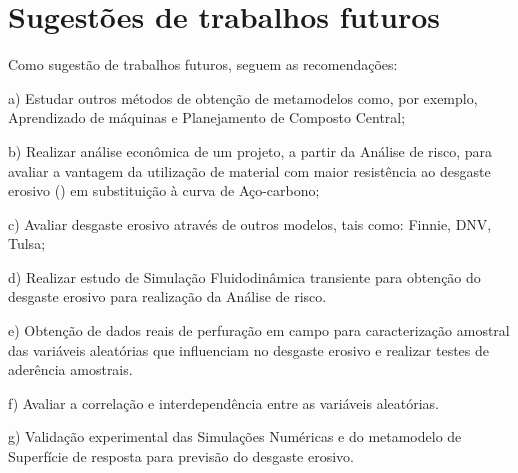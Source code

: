 \section{Sugestões de trabalhos futuros}

Como sugestão de trabalhos futuros, seguem as recomendações:

a) Estudar outros métodos de obtenção de metamodelos como, por exemplo, Aprendizado de máquinas e Planejamento de Composto Central;

b) Realizar análise econômica de um projeto, a partir da Análise de risco, para avaliar a vantagem da utilização de material com maior resistência ao desgaste erosivo () em substituição à curva de Aço-carbono;

c) Avaliar desgaste erosivo através de outros modelos, tais como: Finnie, DNV, Tulsa;

d) Realizar estudo de Simulação Fluidodinâmica transiente para obtenção do desgaste erosivo para realização da Análise de risco.

e) Obtenção de dados reais de perfuração em campo para caracterização amostral das variáveis aleatórias que influenciam no desgaste erosivo e realizar testes de aderência amostrais. 

f) Avaliar a correlação e interdependência entre as variáveis aleatórias.

g) Validação experimental das Simulações Numéricas e do metamodelo de Superfície de resposta para previsão do desgaste erosivo.
